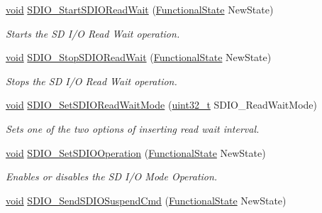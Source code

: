 \begin{DoxyCompactItemize}
\hyperlink{usb__devapi_8h_afabf60e7f57651d6d595a02c75f07cd0}{void} \hyperlink{group___s_d_i_o___exported___functions_gac88f914d9a68a83abc2265ec8a7b79fc}{S\+D\+I\+O\+\_\+\+Start\+S\+D\+I\+O\+Read\+Wait} (\hyperlink{agilefox_2library_2inc_2stm32f10x__type_8h_ac9a7e9a35d2513ec15c3b537aaa4fba1}{Functional\+State} New\+State)
\begin{DoxyCompactList}\small\item\em Starts the SD I/O Read Wait operation. \end{DoxyCompactList}\item 
\hyperlink{usb__devapi_8h_afabf60e7f57651d6d595a02c75f07cd0}{void} \hyperlink{group___s_d_i_o___exported___functions_gaca6b25eb2debb73ac827c66f0ebcf837}{S\+D\+I\+O\+\_\+\+Stop\+S\+D\+I\+O\+Read\+Wait} (\hyperlink{agilefox_2library_2inc_2stm32f10x__type_8h_ac9a7e9a35d2513ec15c3b537aaa4fba1}{Functional\+State} New\+State)
\begin{DoxyCompactList}\small\item\em Stops the SD I/O Read Wait operation. \end{DoxyCompactList}\item 
\hyperlink{usb__devapi_8h_afabf60e7f57651d6d595a02c75f07cd0}{void} \hyperlink{group___s_d_i_o___exported___functions_ga2baac4ea1bb6c2d94345d2712604338a}{S\+D\+I\+O\+\_\+\+Set\+S\+D\+I\+O\+Read\+Wait\+Mode} (\hyperlink{_p_e___types_8h_a33594304e786b158f3fb30289278f5af}{uint32\+\_\+t} S\+D\+I\+O\+\_\+\+Read\+Wait\+Mode)
\begin{DoxyCompactList}\small\item\em Sets one of the two options of inserting read wait interval. \end{DoxyCompactList}\item 
\hyperlink{usb__devapi_8h_afabf60e7f57651d6d595a02c75f07cd0}{void} \hyperlink{group___s_d_i_o___exported___functions_ga24e210c185d5a7855cbaff4472a8f8d1}{S\+D\+I\+O\+\_\+\+Set\+S\+D\+I\+O\+Operation} (\hyperlink{agilefox_2library_2inc_2stm32f10x__type_8h_ac9a7e9a35d2513ec15c3b537aaa4fba1}{Functional\+State} New\+State)
\begin{DoxyCompactList}\small\item\em Enables or disables the SD I/O Mode Operation. \end{DoxyCompactList}\item 
\hyperlink{usb__devapi_8h_afabf60e7f57651d6d595a02c75f07cd0}{void} \hyperlink{group___s_d_i_o___exported___functions_ga9264137a01a1ab81d03bc80a3b3120fc}{S\+D\+I\+O\+\_\+\+Send\+S\+D\+I\+O\+Suspend\+Cmd} (\hyperlink{agilefox_2library_2inc_2stm32f10x__type_8h_ac9a7e9a35d2513ec15c3b537aaa4fba1}{Functional\+State} New\+State)

\end{DoxyCompactItemize}
